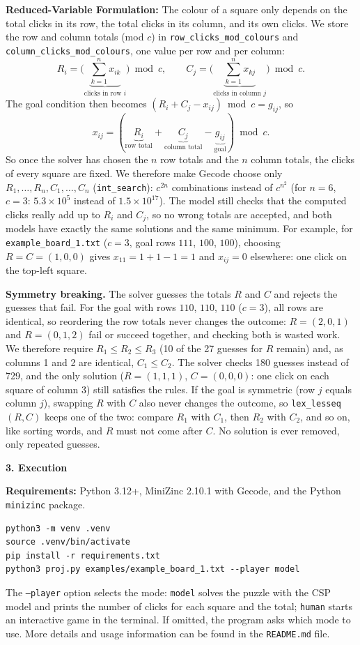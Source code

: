 \documentclass[a4paper,9pt]{article}
\begin{document}
\textbf{Reduced-Variable Formulation:}
The colour of a square only depends on the total clicks in its row, the total
clicks in its column, and its own clicks. We store the row and column totals
(mod $c$) in \texttt{row\_clicks\_mod\_colours} and
\texttt{column\_clicks\_mod\_colours}, one value per row and per column:
\[
R_i=\Big(\underbrace{\sum_{k=1}^{n}x_{ik}}_{\text{clicks in row }i}\Big)\bmod c,
\qquad
C_j=\Big(\underbrace{\sum_{k=1}^{n}x_{kj}}_{\text{clicks in column }j}\Big)\bmod c.
\]
The goal condition then becomes $(R_i+C_j-x_{ij})\bmod c=g_{ij}$, so
\[
x_{ij}=(\underbrace{R_i}_{\text{row total}}+\underbrace{C_j}_{\text{column total}}
-\underbrace{g_{ij}}_{\text{goal}})\bmod c.
\]
So once the solver has chosen the $n$ row totals and the $n$ column totals, the
clicks of every square are fixed. We therefore make Gecode choose only
$R_1,\ldots,R_n,C_1,\ldots,C_n$ (\texttt{int\_search}): $c^{2n}$ combinations
instead of $c^{n^2}$ (for $n=6$, $c=3$: $5.3\times10^5$ instead of
$1.5\times10^{17}$). The model still checks that the computed clicks really add
up to $R_i$ and $C_j$, so no wrong totals are accepted, and both models have
exactly the same solutions and the same minimum.
For example, for \texttt{example\_board\_1.txt} ($c=3$, goal rows $111$, $100$,
$100$), choosing $R=C=(1,0,0)$ gives $x_{11}=1+1-1=1$ and $x_{ij}=0$ elsewhere:
one click on the top-left square.

\textbf{Symmetry breaking.}
The solver guesses the totals $R$ and $C$ and rejects the guesses that fail. For
the goal with rows $110$, $110$, $110$ ($c=3$), all rows are identical, so
reordering the row totals never changes the outcome: $R=(2,0,1)$ and
$R=(0,1,2)$ fail or succeed together, and checking both is wasted work. We
therefore require $R_1\le R_2\le R_3$ (10 of the 27 guesses for $R$ remain) and,
as columns 1 and 2 are identical, $C_1\le C_2$. The solver checks 180 guesses
instead of 729, and the only solution ($R=(1,1,1)$, $C=(0,0,0)$: one click on
each square of column 3) still satisfies the rules. If the goal is symmetric
(row $j$ equals column $j$), swapping $R$ with $C$ also never changes the
outcome, so \texttt{lex\_lesseq}$(R,C)$ keeps one of the two: compare $R_1$ with
$C_1$, then $R_2$ with $C_2$, and so on, like sorting words, and $R$ must not
come after $C$. No solution is ever removed, only repeated guesses.

\textbf{3. Execution}

\textbf{Requirements:} Python 3.12+, MiniZinc 2.10.1 with Gecode, and the Python \texttt{minizinc} package.
\begin{verbatim}
python3 -m venv .venv
source .venv/bin/activate
pip install -r requirements.txt
python3 proj.py examples/example_board_1.txt --player model
\end{verbatim}
The \texttt{--player} option selects the mode:
\texttt{model} solves the puzzle with the CSP model and prints the number of clicks
for each square and the total; \texttt{human} starts an interactive game in the terminal. If omitted, the program asks which mode to use. More details and
usage information can be found in the \texttt{README.md} file.
\end{document}
